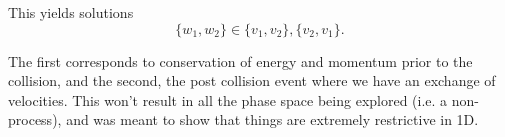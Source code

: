 {This yields solutions
\begin{equation}\label{eqn:midterm1review:280}
\{w_1, w_2\} \in \{v_1, v_2\}, \{v_2, v_1\}.
\end{equation}

The first corresponds to conservation of energy and momentum prior to the collision, and the second, the post collision event where we have an exchange of velocities.  This won't result in all the phase space being explored (i.e. a non- process), and was meant to show that things are extremely restrictive in 1D.
} %
